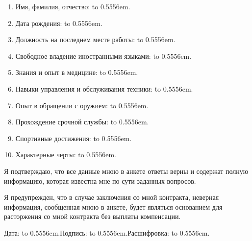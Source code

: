 \documentclass[twoside]{article}
\providecommand{\fillinline}[1]{
  \leavevmode\leaders\hbox to 0.5556em{\hss.\hss}\hfill\kern0pt}
\begin{document}
\begin{enumerate}
\def\labelenumi{\arabic{enumi}.}
\item
  Имя, фамилия, отчество:\fillinline{}
\item
  Дата рождения:\fillinline{}
\item
  Должность на последнем месте работы:\fillinline{}

  {\scriptsize{}}
\item
  Свободное владение иностранными языками:\fillinline{}
\item
  Знания и опыт в медицине:\fillinline{}

  {\scriptsize{}}
\item
  Навыки управления и обслуживания техники:\fillinline{}

  {\scriptsize{}}
\item
  Опыт в обращении с оружием:\fillinline{}

  {\scriptsize{}}
\item
  Прохождение срочной службы:\fillinline{}

  {\scriptsize{}}
\item
  Спортивные достижения:\fillinline{}

  {\scriptsize{}}
\item
  Характерные черты:\fillinline{}

  {\scriptsize{}}
\end{enumerate}

Я подтверждаю, что все данные мною в анкете ответы верны и содержат полную информацию, которая известна мне по сути заданных вопросов.

Я предупрежден, что в случае заключения со мной контракта, неверная информация, сообщенная мною в анкете, будет являться основанием для расторжения со мной контракта без выплаты компенсации.

Дата:\fillinline{}Подпись:\fillinline{}Расшифровка:\fillinline{}

\clearpage
\end{document}
